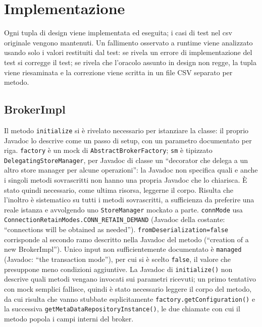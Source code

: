 \section{Implementazione}
\label{sec:implementazione}

Ogni tupla di design viene implementata ed eseguita; i casi di test nel csv originale vengono
mantenuti. Un fallimento osservato a runtime viene analizzato usando solo i valori restituiti
dal test: se rivela un errore di implementazione del test si corregge il test; se rivela che
l'oracolo assunto in design non regge, la tupla viene riesaminata e la correzione viene scritta
in un file CSV separato per metodo.

\subsection{BrokerImpl}

Il metodo \texttt{initialize} si è rivelato necessario per istanziare la classe: il proprio
Javadoc lo descrive come un passo di setup, con un parametro documentato per riga. \texttt{factory}
è un mock di \texttt{AbstractBrokerFactory}; \texttt{sm} è tipizzato \texttt{DelegatingStoreManager},
per Javadoc di classe un ``decorator che delega a un altro store manager per alcune operazioni'':
la Javadoc non specifica quali e anche i singoli metodi sovrascritti non hanno una propria Javadoc che lo chiarisca. È stato
quindi necessario, come ultima risorsa, leggerne il corpo. Risulta che l'inoltro è sistematico su tutti i metodi
sovrascritti, a sufficienza da preferire una reale istanza e avvolgendo uno \texttt{StoreManager} mockato a parte.
\texttt{connMode} usa
\texttt{ConnectionRetainModes.CONN\_RETAIN\_DEMAND} (Javadoc della costante: ``connections will be
obtained as needed''). \texttt{fromDeserialization=false} corrisponde al secondo ramo descritto
nella Javadoc del metodo (``creation of a new BrokerImpl''). Unico input non sufficientemente
documentato è \texttt{managed} (Javadoc: ``the transaction mode''), per cui si è scelto
\texttt{false}, il valore che presuppone meno condizioni aggiuntive. La Javadoc di
\texttt{initialize()} non descrive quali metodi vengano invocati sui parametri ricevuti; un
primo tentativo con mock semplici fallisce, quindi è stato necessario leggere il corpo del
metodo, da cui risulta che vanno stubbate esplicitamente \texttt{factory.getConfiguration()} e
la successiva \texttt{getMetaDataRepositoryInstance()}, le due chiamate con cui il metodo popola
i campi interni del broker.

